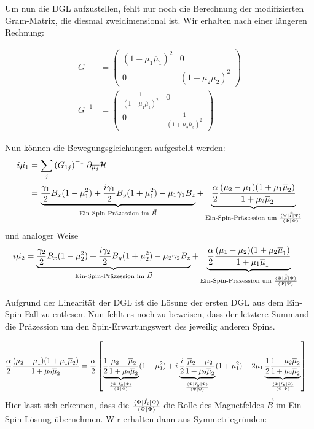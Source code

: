 \documentclass[12pt]{article}
\def\N{\bra{\Psi}\ket{\Psi}}
\def\muk{\overline{\mu}}
\begin{document}
Um nun die DGL aufzustellen, fehlt nur noch die Berechnung der modifizierten Gram-Matrix, die diesmal zweidimensional ist. 
Wir erhalten nach einer längeren Rechnung:

\begin{align}
    G &=
    \begin{pmatrix}
        (1+\mu_1\muk_1)^2 & 0 \\
        0 &(1+\mu_2\muk_2)^2
    \end{pmatrix} \\
    G^{-1} &=
    \begin{pmatrix}
        \frac{1}{(1+\mu_1\muk_1)^2} & 0 \\
        0 &\frac{1}{(1+\mu_2\muk_2)^2}
    \end{pmatrix}
\end{align}

\noindent Nun können die Bewegungsgleichungen aufgestellt werden:
\begin{align}
    i\dot{\mu_1} &= \sum_{j}\left(G_{1j}\right)^{-1}\thinspace \partial_{\overline{\mu_j}}\mathcal{H}  \\
    &=\underbrace{\frac{\gamma_1}{2}B_x(1-\mu_1^2) + \frac{i\gamma_1}{2}B_y(1+\mu_1^2) -\mu_1 \gamma_1 B_z}_{\text{Ein-Spin-Präzession im } \vec{B}} +\underbrace{\frac{\alpha}{2} \frac{(\mu_2-\mu_1)(1+\mu_1\muk_2)}{1+\mu_2\muk_2}}_{\text{Ein-Spin-Präzession um } \frac{\bra{\Psi}\hat{\vec{I}}\ket{\Psi}}{\N}  }    
\end{align}
und analoger Weise 
\begin{align}
    i\dot{\mu_2} &= \underbrace{\frac{\gamma_2}{2}B_x(1-\mu_2^2) + \frac{i\gamma_2}{2}B_y(1+\mu_2^2) -\mu_2 \gamma_2 B_z}_{\text{Ein-Spin-Präzession im } \vec{B}} +\underbrace{\frac{\alpha}{2} \frac{(\mu_1-\mu_2)(1+\mu_2\muk_1)}{1+\mu_1\muk_1}}_{\text{Ein-Spin-Präzession um } \frac{\bra{\Psi}\hat{\vec{S}}\ket{\Psi}}{\N}  }
\end{align}

\noindent Aufgrund der Linearität der DGL ist die Lösung der ersten DGL aus dem Ein-Spin-Fall zu entlesen. Nun fehlt es noch zu beweisen, 
dass der letztere Summand die Präzession um den Spin-Erwartungswert des jeweilig anderen Spins.

\begin{align}
    \frac{\alpha}{2} \frac{(\mu_2-\mu_1)(1+\mu_1\muk_2)}{1+\mu_2\muk_2} &= 
     \frac{\alpha}{2}\left[\underbrace{\frac{1}{2}\frac{\mu_2 + \muk_2}{1+\mu_2\muk_2}}_{\frac{\bra{\Psi}\hat{I_x}\ket{\Psi}}{\N}}(1-\mu_1^2) + i \underbrace{\frac{i}{2}\frac{\muk_2 -\mu_2}{1+\mu_2\muk_2}}_{\frac{\bra{\Psi}\hat{I_y}\ket{\Psi}}{\N}}(1+\mu_1^2) - 2\mu_1\underbrace{\frac{1}{2}\frac{1-\mu_2\muk_2}{1+\mu_2\muk_2}}_{\frac{\bra{\Psi}\hat{I_z}\ket{\Psi}}{\N}} \right]
\end{align}
Hier lässt sich erkennen, dass die $\frac{\bra{\Psi}\hat{I_i}\ket{\Psi}}{\N}$ die Rolle des Magnetfeldes $\vec{B}$ im Ein-Spin-Lösung 
übernehmen. Wir erhalten dann aus Symmetriegründen:
\end{document}
